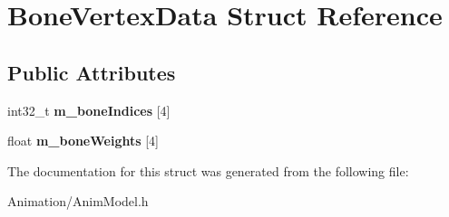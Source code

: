 \hypertarget{structBoneVertexData}{}\section{Bone\+Vertex\+Data Struct Reference}
\label{structBoneVertexData}
\subsection*{Public Attributes}
\begin{DoxyCompactItemize}
\item 
\mbox{\label{structBoneVertexData_ab3244a27730090f33a966f117796a15c}} 
int32\+\_\+t {\bfseries m\+\_\+bone\+Indices} \mbox{[}4\mbox{]}
\item 
\mbox{\label{structBoneVertexData_ab8de7e288e7068d116df550470c41c14}} 
float {\bfseries m\+\_\+bone\+Weights} \mbox{[}4\mbox{]}
\end{DoxyCompactItemize}


The documentation for this struct was generated from the following file\+:\begin{DoxyCompactItemize}
\item 
Animation/Anim\+Model.\+h\end{DoxyCompactItemize}
